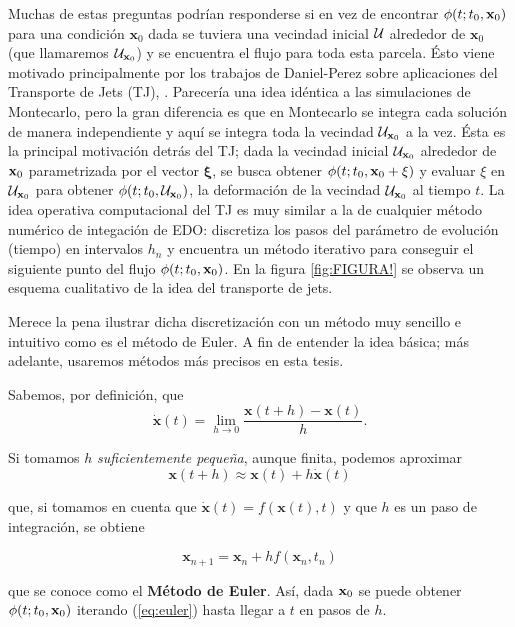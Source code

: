Muchas de estas preguntas podrían responderse si en vez de encontrar $\phi(t;t_0,\mathbf{x}_0)$ para una condición $\mathbf{x}_0$ dada se tuviera una vecindad inicial $\mathcal{U}$ alrededor de $\mathbf{x}_0$ (que llamaremos $\mathcal{U}_{\mathbf{x}_0}$) y se encuentra el flujo para toda esta parcela. Ésto viene motivado principalmente por los trabajos de Daniel-Perez sobre aplicaciones del Transporte de Jets (TJ), \cite{Perez2013,Perez2015}. Parecería una idea idéntica a las simulaciones de Montecarlo, pero la gran diferencia es que en Montecarlo se integra cada solución de manera independiente y aquí se integra toda la vecindad $\mathcal{U}_{\mathbf{x}_0}$ a la vez. Ésta es la principal motivación detrás del TJ; dada la vecindad inicial $\mathcal{U}_{\mathbf{x}_0}$ alrededor de $\mathbf{x}_0$ parametrizada por el vector $\mathbf{\xi}$, se busca obtener $\phi(t;t_0,\mathbf{x}_0 + \xi)$ y evaluar $\xi$ en $\mathcal{U}_{\mathbf{x}_0}$ para obtener $\phi(t;t_0,\mathcal{U}_{\mathbf{x}_0} )$, la deformación de la vecindad $\mathcal{U}_{\mathbf{x}_0}$ al tiempo $t$. La idea operativa computacional del TJ es muy similar a la de cualquier método numérico de integación de EDO: discretiza los pasos del parámetro de evolución (tiempo) en intervalos $h_n$ y encuentra un método iterativo para conseguir el siguiente punto del flujo $\phi(t;t_0,\mathbf{x}_0)$. En la figura \ref{fig:FIGURA!} se observa un esquema cualitativo de la idea del transporte de jets.


Merece la pena ilustrar dicha discretización con un método muy sencillo e intuitivo como es el método de Euler. A fin de entender la idea básica; más adelante, usaremos métodos más precisos en esta tesis.

Sabemos, por definición, que 
\begin{equation*}
 \dot{\mathbf{x}}(t) = \lim_{h\to 0} \frac{\mathbf{x}(t+h)-\mathbf{x}(t)}{h}.
\end{equation*}  

Si tomamos $h$ \textit{suficientemente pequeña}, aunque finita, podemos aproximar
\begin{equation*}
 \mathbf{x}(t+h) \approx \mathbf{x}(t) + h \dot{\mathbf{x}}(t)
\end{equation*}

que, si tomamos en cuenta que $\dot{\mathbf{x}}(t) = f(\mathbf{x}(t),t)$ y que $h$ es un paso de integración, se obtiene
 
\begin{equation}
 \mathbf{x}_{n+1} = \mathbf{x}_n + h f(\mathbf{x}_n,t_n)
 \label{eq:euler} 
\end{equation}

que se conoce como el \textbf{Método de Euler}. Así, dada $\mathbf{x}_0$ se puede obtener $\phi(t;t_0,\mathbf{x}_0)$ iterando (\ref{eq:euler}) hasta llegar a $t$ en pasos de $h$.

